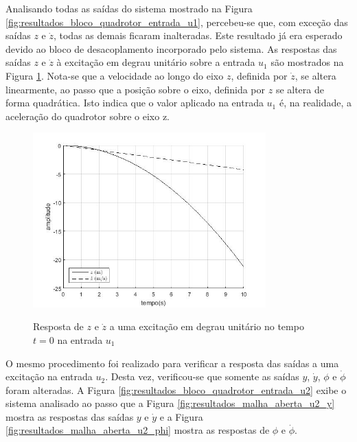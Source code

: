 Analisando todas as saídas do sistema mostrado na Figura \ref{fig:resultados_bloco_quadrotor_entrada_u1}, percebeu-se que, com exceção das saídas $z$ e $\dot{z}$, todas as demais ficaram inalteradas. Este resultado já era esperado devido ao bloco de desacoplamento incorporado pelo sistema. As respostas das saídas $z$ e $\dot{z}$ à excitação em degrau unitário sobre a entrada $u_1$ são mostrados na Figura \ref{fig:resultados_malha_aberta_u1_z}. Nota-se que a velocidade ao longo do eixo $z$, definida por $\dot{z}$, se altera linearmente, ao passo que a posição sobre o eixo, definida por $z$ se altera de forma quadrática. Isto indica que o valor aplicado na entrada $u_1$ é, na realidade, a aceleração do quadrotor sobre o eixo z.

\begin{figure}[!htb]
    \centering
    \caption{Resposta de $z$ e $\dot{z}$ a uma excitação em degrau unitário no tempo $t=0$ na entrada $u_1$}
    \includegraphics[width=0.8\textwidth]{./04-figuras/resultados/malha_aberta/u1_z}
    \label{fig:resultados_malha_aberta_u1_z}
\end{figure}

O mesmo procedimento foi realizado para verificar a resposta das saídas a uma excitação na entrada $u_2$. Desta vez, verificou-se que somente as saídas $y$, $\dot{y}$, $\phi$ e $\dot{\phi}$ foram alteradas. A Figura \ref{fig:resultados_bloco_quadrotor_entrada_u2} exibe o sistema analisado ao passo que a Figura \ref{fig:resultados_malha_aberta_u2_y} mostra as respostas das saídas $y$ e $\dot{y}$ e a Figura \ref{fig:resultados_malha_aberta_u2_phi} mostra as respostas de $\phi$ e $\dot{\phi}$.

